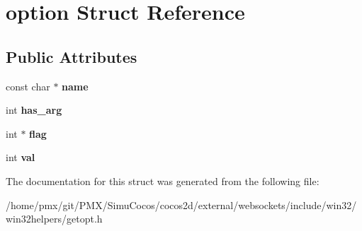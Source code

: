 \hypertarget{structoption}{}\section{option Struct Reference}
\label{structoption}
\subsection*{Public Attributes}
\begin{DoxyCompactItemize}
\item 
\mbox{\label{structoption_adc503659d37af8017fb4b86d61c99086}} 
const char $\ast$ {\bfseries name}
\item 
\mbox{\label{structoption_a90d7ee9a51eea5c002682dbd0af149e4}} 
int {\bfseries has\+\_\+arg}
\item 
\mbox{\label{structoption_ab366eea5fe7be25c1928328ba715e353}} 
int $\ast$ {\bfseries flag}
\item 
\mbox{\label{structoption_a13bd155ec3b405d29c41ab8d0793be11}} 
int {\bfseries val}
\end{DoxyCompactItemize}


The documentation for this struct was generated from the following file\+:\begin{DoxyCompactItemize}
\item 
/home/pmx/git/\+P\+M\+X/\+Simu\+Cocos/cocos2d/external/websockets/include/win32/win32helpers/getopt.\+h\end{DoxyCompactItemize}
